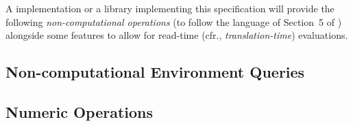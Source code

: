 \documentclass[../../CDR-IEEE-754-support.tex]{subfiles}
\begin{document}
\label{sect:fp-operations}

A \CL{} implementation or a \CL{} library implementing this
specification will provide the following \emph{non-computational
  operations} (to follow the language of Section~5 of \cite{2008:IEEE-754})
alongside some \CL{} features to allow for read-time (cfr.,
\emph{translation-time}) evaluations.


\subsection{Non-computational \CL{} Environment \IEEEFPStd{} Queries}

\newpage

\subsection{Numeric Operations}

\end{document}
